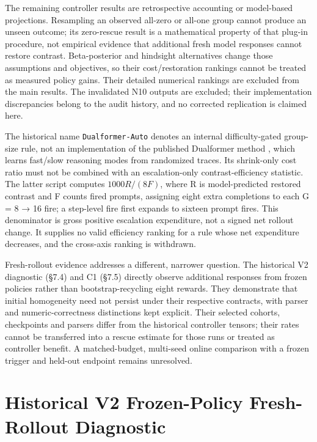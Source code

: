 \documentclass[12pt,a4paper]{report}
\begin{document}
The remaining controller results are retrospective accounting or
model-based projections. Resampling an observed all-zero or all-one
group cannot produce an unseen outcome; its zero-rescue result is a
mathematical property of that plug-in procedure, not empirical evidence
that additional fresh model responses cannot restore contrast.
Beta-posterior and hindsight alternatives change those assumptions and
objectives, so their cost/restoration rankings cannot be treated as
measured policy gains. Their detailed numerical rankings are excluded
from the main results. The invalidated N10 outputs are excluded; their
implementation discrepancies belong to the audit history, and no
corrected replication is claimed here.

The historical name \texttt{Dualformer-Auto} denotes an internal
difficulty-gated group-size rule, not an implementation of the published
Dualformer method \citep{su2025dualformer}, which learns fast/slow
reasoning modes from randomized traces. Its shrink-only cost ratio must
not be combined with an escalation-only contrast-efficiency statistic.
The latter script computes \(1000R/(8F)\), where R is model-predicted
restored contrast and F counts fired prompts, assigning eight extra
completions to each G = 8 → 16 fire; a step-level fire first expands to
sixteen prompt fires. This denominator is gross positive escalation
expenditure, not a signed net rollout change. It supplies no valid
efficiency ranking for a rule whose net expenditure decreases, and the
cross-axis ranking is withdrawn.

Fresh-rollout evidence addresses a different, narrower question. The
historical V2 diagnostic (§7.4) and C1 (§7.5) directly observe
additional responses from frozen policies rather than
bootstrap-recycling eight rewards. They demonstrate that initial
homogeneity need not persist under their respective contracts, with
parser and numeric-correctness distinctions kept explicit. Their
selected cohorts, checkpoints and parsers differ from the historical
controller tensors; their rates cannot be transferred into a rescue
estimate for those runs or treated as controller benefit. A
matched-budget, multi-seed online comparison with a frozen trigger and
held-out endpoint remains unresolved.

\section{Historical V2 Frozen-Policy Fresh-Rollout
Diagnostic}\label{historical-v2-frozen-policy-fresh-rollout-diagnostic}
\end{document}

